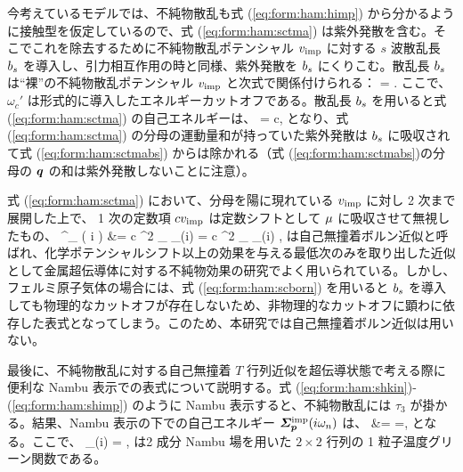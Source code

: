 今考えているモデルでは、不純物散乱も式 (\ref{eq:form:ham:himp}) から分かるように接触型を仮定しているので、式 (\ref{eq:form:ham:sctma}) は紫外発散を含む。そこでこれを除去するために不純物散乱ポテンシャル $v_{\text{imp}}$ に対する $s$ 波散乱長 $b_s$ を導入し、引力相互作用の時と同様、紫外発散を $b_s$ にくりこむ。散乱長 $b_s$ は“裸”の不純物散乱ポテンシャル $v_{\text{imp}}$ と次式で関係付けられる：
 \beq
  = .\label{eq:form:ham:bskf}
\eeq
ここで、$\omega_c'$ は形式的に導入したエネルギーカットオフである。散乱長 $b_s$ を用いると式 (\ref{eq:form:ham:sctma}) の自己エネルギーは、
\beq
\sigimppom = c,\label{eq:form:ham:sctmabs}
\eeq
となり、式 (\ref{eq:form:ham:sctma}) の分母の運動量和が持っていた紫外発散は $b_s$ に吸収されて式 (\ref{eq:form:ham:sctmabs}) からは除かれる（式 (\ref{eq:form:ham:sctmabs})の分母の $\bm{q}$ の和は紫外発散しないことに注意）。

式 (\ref{eq:form:ham:sctma}) において、分母を陽に現れている $v_{\text{imp}}$ に対し 2 次まで展開した上で、 1 次の定数項 $c v_{\text{imp}}$ は定数シフトとして $\mu$ に吸収させて無視したもの、
\beq
\varSigma^{}_{} ( i \omn) &= c \vimp^2 \sum_{\bq} \gimp_{\bq}(i\omn) = c ^2 \sum_{\bq} \gimp_{\bq}(i\omn) ,\label{eq:form:ham:scborn}
\eeq 
は自己無撞着ボルン近似と呼ばれ、化学ポテンシャルシフト以上の効果を与える最低次のみを取り出した近似として金属超伝導体に対する不純物効果の研究でよく用いられている。しかし、フェルミ原子気体の場合には、式 (\ref{eq:form:ham:scborn}) を用いると $b_s$ を導入しても物理的なカットオフが存在しないため、非物理的なカットオフに顕わに依存した表式となってしまう。このため、本研究では自己無撞着ボルン近似は用いない。

最後に、不純物散乱に対する自己無撞着 $T$ 行列近似を超伝導状態で考える際に便利な Nambu 表示での表式について説明する。式 (\ref{eq:form:ham:shkin})-(\ref{eq:form:ham:shimp}) のように Nambu 表示すると、不純物散乱には $\tau_3$ が掛かる。結果、Nambu 表示の下での自己エネルギー $\bm{\varSigma}^{\text{imp}}_{\bm{p}}(i\omega_n)$ は、
\beq
\bsigimppom &= \con \bvvtxn=\con {},\label{eq:form:ham:abcslimp}
\eeq 
となる。ここで、
\beq
\bgimp_{\bp}(i\omn) = ,
\eeq
は2 成分 Nambu 場を用いた $2 \times 2$ 行列の 1 粒子温度グリーン関数である。
